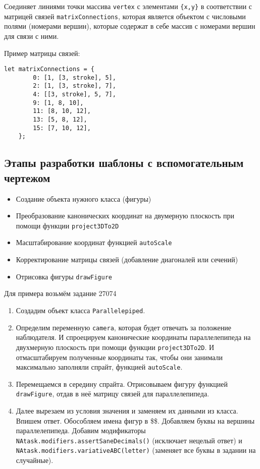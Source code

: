 Соединяет линиями точки массива \texttt{vertex} с элементами \texttt{\{x,y\}} в соответствии с матрицей связей \texttt{matrixConnections}, которая является объектом с числовыми полями (номерами вершин), которые содержат в себе массив с номерами вершин для связи с ними.

Пример матрицы связей:
\begin{lstlisting}[frame=none]
	let matrixConnections = {
		0: [1, [3, stroke], 5],
		2: [1, [3, stroke], 7],
		4: [[3, stroke], 5, 7],
		9: [1, 8, 10],
		11: [8, 10, 12],
		13: [5, 8, 12],
		15: [7, 10, 12],
	};
	\end{lstlisting}

\subsection{Этапы разработки шаблоны с вспомогательным чертежом}

\begin{itemize}
	\item Создание объекта нужного класса (фигуры)
	\item Преобразование канонических координат на двумерную плоскость при помощи функции \texttt{project3DTo2D}
	\item Масштабирование координат функцией \texttt{autoScale}
	\item Корректирование матрицы связей (добавление диагоналей или сечений)
	\item Отрисовка фигуры \texttt{drawFigure}
\end{itemize}

Для примера возьмём задание 27074



\begin{enumerate}
	\item Создадим объект класса \texttt{Parallelepiped}. 
	
	\item Определим переменную \texttt{camera}, которая будет отвечать за положение наблюдателя. И спроецируем канонические координаты параллелепипеда на двухмерную плоскость при помощи функции \texttt{project3DTo2D}. И отмасштабируем полученные координаты так, чтобы они занимали максимально заполняли спрайт, функцией \texttt{autoScale}.
	
	\item Перемещаемся в середину спрайта. Отрисовываем фигуру функцией \texttt{drawFigure}, отдав в неё матрицу связей для параллелепипеда. 
	
	\item Далее вырезаем из условия значения и заменяем их данными из класса. Впишем ответ. Обособляем имена фигур в \$\$. Добавляем буквы на вершины параллелепипеда. Добавим модификаторы          \texttt{NAtask.modifiers.assertSaneDecimals()} (исключает нецелый ответ) и
	\texttt{NAtask.modifiers.variativeABC(letter)} (заменяет все буквы в задании на случайные).
	
\end{enumerate}

